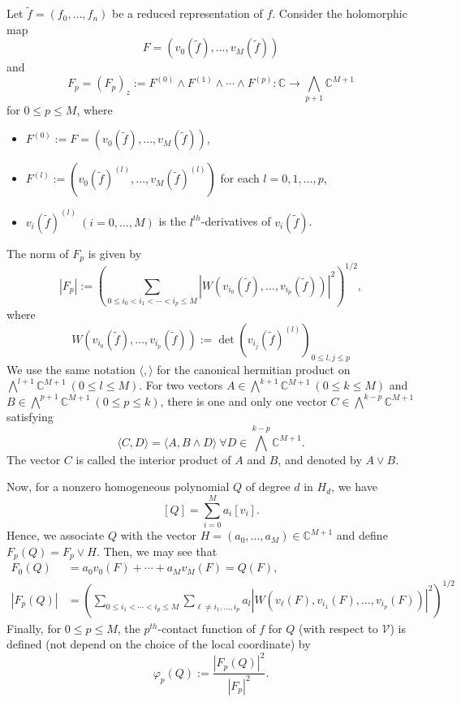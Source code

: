 \documentclass[12pt]{amsart}
\newcommand{\C}{{\mathbb{C}}}
\begin{document}
Let $\tilde f=(f_0,\ldots,f_n)$ be a reduced representation of $f$. Consider the holomorphic map
$$ F=(v_0(\tilde f),\ldots,v_M(\tilde f))$$
and 
$$F_{p} = (F_{p})_z := F^{(0)} \wedge F^{(1)} \wedge \cdots \wedge F^{(p)}:\C\rightarrow \bigwedge_{p+1}\C^{M+1}$$
for $0\le p\le M$, where 
\begin{itemize}
\item $F^{(0)}:=F=(v_0(\tilde f),\ldots,v_M(\tilde f))$,
\item $F^{(l)}:=\left (v_0(\tilde f)^{(l)},\ldots, v_M(\tilde f)^{(l)}\right)$ for each $l=0, 1,\ldots , p$,
\item $v_i(\tilde f)^{(l)} \ (i =0,\ldots, M)$ is the $l^{th}$-derivatives of $v_i(\tilde f)$.
\end{itemize}
The norm of $F_{p}$ is given by
$$|F_{p}|:=\left (\sum_{0\le i_0<i_1<\cdots<i_p\le M}\left |W(v_{i_0}(\tilde f),\ldots,v_{i_p}(\tilde f))\right|^2\right)^{1/2}, $$
where 
$$W(v_{i_0}(\tilde f),\ldots,v_{i_p}(\tilde f)):=\det\left (v_{i_j}(\tilde f)^{(l)}\right)_{0\le l,j\le p}$$ 
% 
We use the same notation $\langle,\rangle$ for the canonical hermitian product on $\bigwedge^{l+1}\C^{M+1}\ (0\le l\le M)$. For two vectors $A\in \bigwedge^{k+1}\C^{M+1}\ (0\le k\le M)$ and $B\in\bigwedge^{p+1}\C^{M+1}\ (0\le p\le k)$, there is one and only one vector $C\in\bigwedge^{k-p}\C^{M+1}$ satisfying 
$$ \langle C,D\rangle=\langle A,B\wedge D\rangle\ \forall D\in \bigwedge^{k-p}\C^{M+1}.$$
The vector $C$ is called the interior product of $A$ and $B$, and denoted by $A\vee B$.

Now, for a nonzero homogeneous polynomial $Q$ of degree $d$ in $H_d$, we have
$$[Q]=\sum_{i=0}^Ma_i[v_i].$$
Hence, we associate $Q$ with the vector $H=(a_0,\ldots,a_M)\in\C^{M+1}$ and define $F_{p}(Q)=F_{p}\vee H$. Then, we may see that
\begin{align*}
F_{0}(Q)&=a_0v_0(F)+\cdots+a_Mv_M(F)=Q(F),\\ 
|F_{p}(Q)|&=\left (\sum_{0\le i_1<\cdots<i_p\le M}\sum_{\ell\ne i_1,\ldots,i_p}a_l\left |W(v_\ell(F),v_{i_1}(F),\ldots,v_{i_p}(F))\right|^2\right)^{1/2}
\end{align*}
Finally, for $0\le p\le M$, the $p^{th}$-contact function of $f$ for $Q$ (with respect to $\mathcal V$) is defined (not depend on the choice of the local coordinate) by
$$\varphi_{p}(Q):=\dfrac{|F_{p}(Q)|^2}{|F_{p}|^2}.$$
\end{document}
